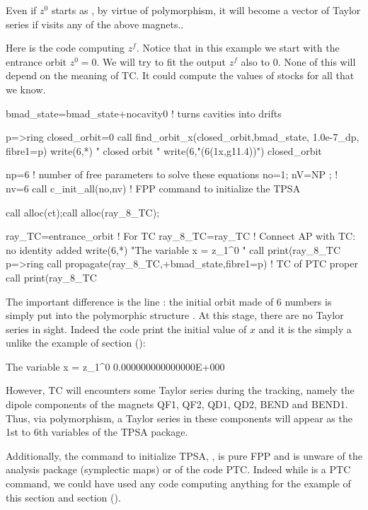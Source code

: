 \documentclass{hitec}     %
\begin{document}
{{Even if  $z^0$ starts as , by virtue of polymorphism, it  will become a vector of Taylor series if  visits any of the above magnets.. 

Here is the code computing $z^f$. Notice that in this example we start with the entrance orbit $z^0=0$.  We will try to fit the output $z^f$ also to $0$. None of this will depend on the meaning of TC. It could compute the values of stocks for all that we know.



\begin{code}
bmad_state=bmad_state+nocavity0 ! turns cavities into drifts

p=>ring%
closed_orbit=0
call find_orbit_x(closed_orbit,bmad_state, 1.0e-7_dp, fibre1=p)
write(6,*) " closed orbit "
write(6,"(6(1x,g11.4))") closed_orbit
 
np=6     ! number of free parameters to solve these equations
no=1; nV=NP ;  ! nv=6 
call c_init_all(no,nv)   ! FPP command to initialize the TPSA
  
call alloc(ct);call alloc(ray_8_TC);
 
ray_TC=entrance_orbit   !  For TC
ray_8_TC=ray_TC  ! Connect AP with TC: no identity added
write(6,*) "The variable x = z_1^0 "
call print(ray_8_TC%
p=>ring%
call propagate(ray_8_TC,+bmad_state,fibre1=p) !  TC of PTC proper
call print(ray_8_TC%
\end{code}
\renewcommand{\codefont}{\small}
 

The important difference is the line : the initial  orbit made of 6  numbers  is simply put into the polymorphic  structure .  At this stage, there are no Taylor series in sight. Indeed the code print the initial value of $x$ and it is the simply a  unlike the example of section   ():

\begin{code}
 The variable x = z_1^0
  0.000000000000000E+000
\end{code}


However,  TC will encounters some Taylor series during the tracking, namely the dipole components of the magnets QF1,  QF2, QD1, QD2, BEND and BEND1. Thus, via polymorphism, a Taylor series in these components will appear as the 1st to  6th variables of the TPSA package. 

Additionally, the command to initialize TPSA,  ,  is pure FPP and is unware of the analysis package (symplectic maps) or of the code PTC. Indeed while  is a PTC command, we could have used any code computing anything for the example of this section and   section ().

}}
\end{document}
